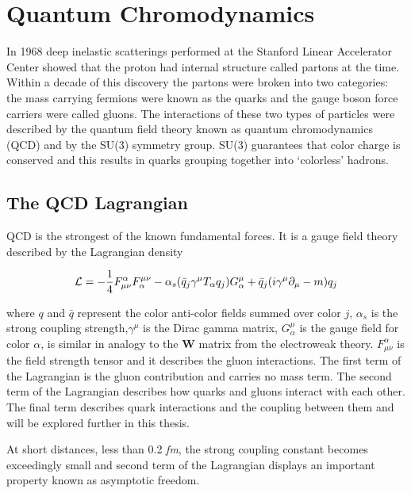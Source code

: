 
\chapter{Quantum Chromodynamics} \label{ch:qcd}
In 1968 deep inelastic scatterings performed at the Stanford Linear Accelerator Center showed that the proton had internal structure\cite{Riordan1287} called partons at the time.  Within a decade of this discovery the partons were broken into two categories: the mass carrying fermions were known as the quarks and the gauge boson force carriers were called gluons.  The interactions of these two types of particles were described by the quantum field theory known as quantum chromodynamics (QCD) and by the SU(3) symmetry group.  SU(3) guarantees that color charge is conserved and this results in quarks grouping together into `colorless' hadrons.

\section{The QCD Lagrangian}
QCD is the strongest of the known fundamental forces.  It is a gauge field theory described by the Lagrangian density

\begin{equation}
{\cal L}=-\frac{1}{4}F^{\alpha}_{\mu\nu}F^{\mu\nu}_{\alpha}
- \alpha_{s} (\bar{q}_{j}\gamma^{\mu}T_{\alpha}q_{j})G_{\alpha}^{\mu}
+ \bar{q}_{j}(i\gamma^{\mu} \partial_{\mu} - m)q_{j}
\label{eq:lagrangian}
\end{equation}

\noindent
where $q$ and $\bar{q}$ represent the color anti-color fields summed over color $j$, $\alpha_{s}$ is the strong coupling strength,$\gamma^{\mu}$ is the Dirac gamma matrix, $G_{\alpha}^{\mu}$ is the gauge field for color \textit{$\alpha$}, is similar in analogy to the \textbf{W} matrix from the electroweak theory.  $F^{\alpha}_{\mu\nu}$ is the field strength tensor and it describes the gluon interactions. The first term of the Lagrangian is the gluon contribution and carries no mass term.  The second term of the Lagrangian describes how quarks and gluons interact with each other. The final term describes quark interactions and the coupling between them and will be explored further in this thesis.

At short distances, less than 0.2 \textit{fm}, the strong coupling constant becomes exceedingly small and second term of the Lagrangian displays an important property known as asymptotic freedom\cite{Wilczek:2005az}. 

